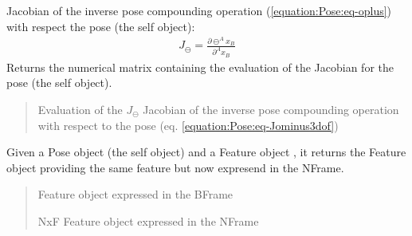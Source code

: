 \documentclass[letterpaper,10pt,english]{sphinxmanual}
\begin{document}
\begin{fulllineitems}
\begin{fulllineitems}
\label{\detokenize{Pose:Pose.Pose.J_ominus}}
\pysigstartsignatures
{}
\pysigstopsignatures
\sphinxAtStartPar
Jacobian of the inverse pose compounding operation (\eqref{equation:Pose:eq-oplus}) with respect the pose  (the self object):
\begin{equation}\label{equation:Pose:eq-Jominus}
\begin{split}J_{\ominus}=\frac{\partial  \ominus ^Ax_B}{\partial ^Ax_B}\end{split}
\end{equation}
\sphinxAtStartPar
Returns the numerical matrix containing the evaluation of the Jacobian for the pose  (the self object).
\begin{quote}\begin{description}
\sphinxAtStartPar
Evaluation of the \(J_{\ominus}\) Jacobian of the inverse pose compounding operation with respect to the pose (eq. \eqref{equation:Pose:eq-Jominus3dof})

\end{description}\end{quote}

\end{fulllineitems}


\begin{fulllineitems}
\label{\detokenize{Pose:Pose.Pose.boxplus}}
\pysigstartsignatures
{}
\pysigstopsignatures
\sphinxAtStartPar
Given a Pose object  (the self object) and a Feature object , it returns the Feature object 
providing the same feature but now expresend in the N\sphinxhyphen{}Frame.
\begin{quote}\begin{description}
\sphinxAtStartPar
{} \textendash{} Feature object expressed in the B\sphinxhyphen{}Frame

\sphinxAtStartPar
NxF Feature object expressed in the N\sphinxhyphen{}Frame


\end{description}
\end{quote}
\end{fulllineitems}
\end{fulllineitems}
\end{document}
